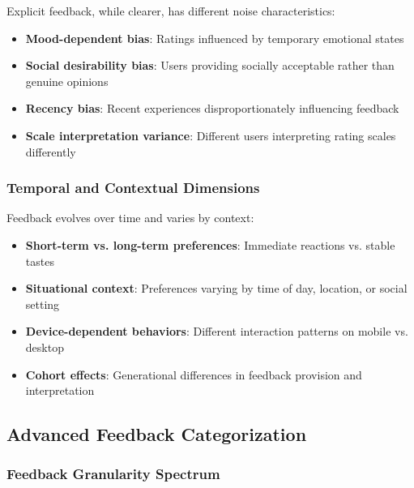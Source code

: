 \documentclass[acmsmall,review,anonymous]{acmart}
\begin{document}
Explicit feedback, while clearer, has different noise characteristics:
\begin{itemize}
    \item \textbf{Mood-dependent bias}: Ratings influenced by temporary emotional states
    \item \textbf{Social desirability bias}: Users providing socially acceptable rather than genuine opinions
    \item \textbf{Recency bias}: Recent experiences disproportionately influencing feedback
    \item \textbf{Scale interpretation variance}: Different users interpreting rating scales differently
\end{itemize}

\subsubsection{Temporal and Contextual Dimensions}

Feedback evolves over time and varies by context:
\begin{itemize}
    \item \textbf{Short-term vs. long-term preferences}: Immediate reactions vs. stable tastes
    \item \textbf{Situational context}: Preferences varying by time of day, location, or social setting
    \item \textbf{Device-dependent behaviors}: Different interaction patterns on mobile vs. desktop
    \item \textbf{Cohort effects}: Generational differences in feedback provision and interpretation
\end{itemize}

\subsection{Advanced Feedback Categorization}

\subsubsection{Feedback Granularity Spectrum}
\end{document}
